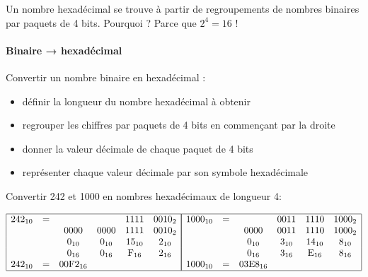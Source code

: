 \documentclass[a4paper,17pt]{extarticle}
\providecommand{\tightlist}{%
      \setlength{\itemsep}{0pt}\setlength{\parskip}{0pt}}
\begin{document}
    Un nombre hexadécimal se trouve à partir de regroupements de nombres
binaires par paquets de 4 bits. Pourquoi ? Parce que \(2^4 = 16\) !
\begin{retenir}
    \hypertarget{binaire-hexaduxe9cimal}{%
\paragraph{Binaire → hexadécimal}\label{binaire-hexaduxe9cimal}}

Convertir un nombre binaire en hexadécimal :

\begin{itemize}
\tightlist
\item
  définir la longueur du nombre hexadécimal à obtenir
\item
  regrouper les chiffres par paquets de 4 bits en commençant par la
  droite
\item
  donner la valeur décimale de chaque paquet de 4 bits
\item
  représenter chaque valeur décimale par son symbole hexadécimale
\end{itemize}

        \end{retenir}\begin{exemple}
    Convertir 242 et 1000 en nombres hexadécimaux de longueur 4:

        \end{exemple}
    \[
\begin{array}{|cccccc|} \hline
242_{10} & = &        &        & 1111   & 0010_2 \\ 
         &   & 0000   & 0000   & 1111   & 0010_2 \\ 
         &   & 0_{10} & 0_{10} &15_{10} & 2_{10} \\ 
         &   & 0_{16} & 0_{16} & \text{F}_{16} & 2_{16}\\
242_{10} & = & \text{00F2}_{16} & & & \\ \hline
\end{array}
\begin{array}{|cccccc|} \hline
1000_{10} & = & & 0011 & 1110 & 1000_2 \\ 
          &   & 0000 & 0011 & 1110 & 1000_2 \\ 
          &   & 0_{10} & 3_{10} & 14_{10} & 8_{10}\\ 
          &   & 0_{16} & \text{3}_{16} & \text{E}_{16} & 8_{16}\\
1000_{10} & = & \text{03E8}_{16} & & & \\\hline
\end{array}
\]
\end{document}

